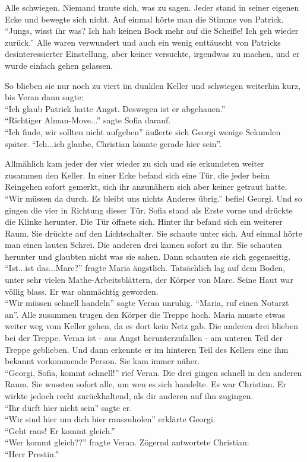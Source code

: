 \documentclass[oneside]{memoir}
\begin{document}
Alle schwiegen. Niemand traute sich, was zu sagen. Jeder stand in seiner eigenen Ecke und bewegte sich nicht.
Auf einmal hörte man die Stimme von Patrick. \\
“Jungs, wisst ihr was? Ich hab keinen Bock mehr auf die Scheiße! 
Ich geh wieder zurück.”
Alle waren verwundert und auch ein wenig enttäuscht von Patricks desinteressierter Einstellung, aber keiner versuchte, irgendwas zu machen, und er wurde einfach gehen gelassen.

So blieben sie nur noch zu viert im dunklen Keller und schwiegen weiterhin kurz, bis Veran dann sagte:  \\
“Ich glaub Patrick hatte Angst. Deswegen ist er abgehauen.” \\
“Richtiger Alman-Move...” sagte Sofia darauf. \\
“Ich finde, wir sollten nicht aufgeben” äußerte sich Georgi wenige Sekunden später. “Ich...ich glaube, Christian könnte gerade hier sein”.

Allmählich kam jeder der vier wieder zu sich und sie erkundeten weiter zusammen den Keller.
In einer Ecke befand sich eine Tür, die jeder beim Reingehen sofort gemerkt, sich ihr anzunähern sich aber keiner getraut hatte.  \\
“Wir müssen da durch. Es bleibt uns nichts Anderes übrig.” befiel Georgi.
Und so gingen die vier in Richtung dieser Tür.
Sofia stand als Erste vorne und drückte die Klinke herunter. Die Tür öffnete sich. Hinter ihr befand sich ein weiterer Raum. Sie drückte auf den Lichtschalter. Sie schaute unter sich.
Auf einmal hörte man einen lauten Schrei.
Die anderen drei kamen sofort zu ihr. Sie schauten herunter und glaubten nicht was sie sahen. Dann schauten sie sich gegenseitig. \\
“Ist...ist das...Marc?” fragte Maria ängstlich.
Tatsächlich lag auf dem Boden, unter sehr vielen Mathe-Arbeitsblättern,
der Körper von Marc. Seine Haut war völlig blass. Er war ohnmächtig geworden. \\
“Wir müssen schnell handeln” sagte Veran unruhig. “Maria, ruf einen Notarzt an”.
Alle zusammen trugen den Körper die Treppe hoch. Maria musste etwas weiter weg vom Keller gehen, da es dort kein Netz gab. Die anderen drei blieben bei der Treppe. Veran ist - aus Angst herunterzufallen - am unteren Teil der Treppe geblieben.
Und dann erkennte er im hinteren Teil des Kellers eine ihm bekannt vorkommende Person. Sie kam immer näher. \\
“Georgi, Sofia, kommt schnell!” rief Veran. Die drei gingen schnell in den anderen Raum. Sie wussten sofort alle, um wen es sich handelte.
Es war Christian.
Er wirkte jedoch recht zurückhaltend, als dir anderen auf ihn zugingen. \\
“Ihr dürft hier nicht sein” sagte er. \\
“Wir sind hier um dich hier rauszuholen” erklärte Georgi. \\
“Geht raus! Er kommt gleich.” \\
“Wer kommt gleich??” fragte Veran.
Zögernd antwortete Christian: \\
“Herr Prestin.”
\end{document}
